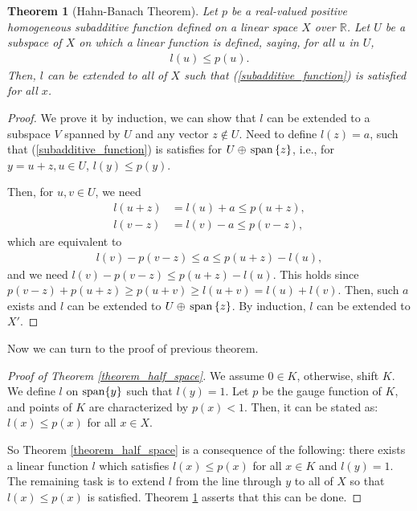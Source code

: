 \documentclass[11pt]{book}
\newtheorem{theorem}{Theorem}[chapter]
\theoremstyle{definition}
\numberwithin{equation}{chapter}
\begin{document}
\begin{theorem}[Hahn-Banach Theorem]\label{Hahn_Banach_Theorem}
Let $p$ be a real-valued positive homogeneous subadditive function defined on a linear space $X$ over $\mathbb{R}$. Let $U$ be a subspace of $X$ on which a linear function is defined, saying, for all $u$ in $U$,
\begin{align}\label{subadditive_function}
    l(u) \leq p(u).
\end{align}
Then, $l$ can be extended to all of $X$ such that (\ref{subadditive_function}) is satisfied for all $x$.
\end{theorem}
\begin{proof}
We prove it by induction, we can show that $l$ can be extended to a subspace $V$ spanned by $U$ and any vector $z \notin U$. Need to define $l(z) = a$, such that (\ref{subadditive_function}) is satisfies for $U \oplus \,{\rm span}\,\{z\}$, i.e., for $y = u + z, u \in U$, $l(y) \leq p(y)$.

Then, for $u, v \in U$, we need 
\begin{align*}
    l(u + z) & = l(u) + a \leq p(u + z), \\
    l(v - z) & = l(v) - a \leq p(v - z),
\end{align*}
which are equivalent to
\begin{align*}
    l(v) - p(v - z) \leq a \leq p(u + z) -l(u),
\end{align*}
and we need $l(v) - p(v - z) \leq p(u + z) -l(u)$. This holds since $p(v - z) + p(u + z) \geq p(u + v) \geq l(u + v) = l(u) + l(v)$. Then, such $a$ exists and $l$ can be extended to $U \oplus \,{\rm span}\, \{z\}$. By induction, $l$ can be extended to $X'$.
\end{proof}

\medskip

Now we can turn to the proof of previous theorem.

\medskip

\begin{proof}[Proof of Theorem \ref{theorem_half_space}]
We assume $0 \in K$, otherwise, shift $K$. We define $l$ on ${\rm span}\{y\}$ such that $l(y) = 1$. Let $p$ be the gauge function of $K$, and points of $K$ are characterized by $p(x) < 1$. Then, it can be stated as: $l(x) \leq p(x)$ for all $x \in X$.

So Theorem \ref{theorem_half_space} is a consequence of the following: there exists a linear function $l$ which satisfies $l(x) \leq p(x)$ for all $x \in K$ and $l(y) = 1$. The remaining task is to extend $l$ from the line through $y$ to all of $X$ so that $l(x) \leq p(x)$ is satisfied. Theorem \ref{Hahn_Banach_Theorem} asserts that this can be done.
\end{proof}
\end{document}
